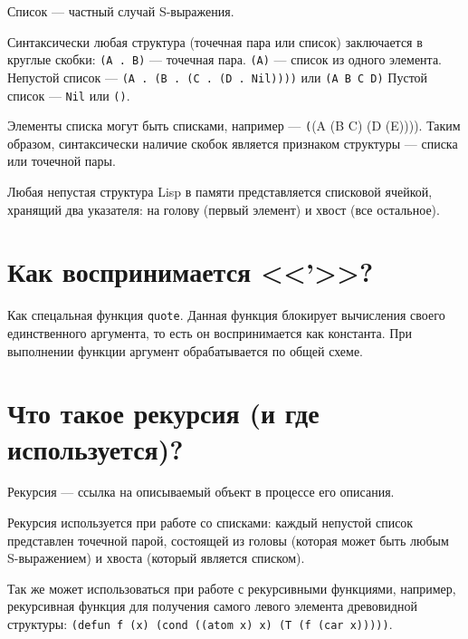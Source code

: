 Список --- частный случай S-выражения.

Синтаксически любая структура (точечная пара или список) заключается в круглые скобки:
\texttt{(A . B)} --- точечная пара.
\texttt{(A)} --- список из одного элемента.
Непустой список --- \texttt{(A . (B . (C . (D . Nil))))} или \texttt{(A B C D)}
Пустой список --- \texttt{Nil} или \texttt{()}.

Элементы списка могут быть списками, например --- \texttt((A (B C) (D (E)))). Таким образом, синтаксически наличие скобок является признаком структуры --- списка или точечной пары.

Любая непустая структура Lisp в памяти представляется  списковой ячейкой, хранящий два указателя: на голову (первый элемент) и хвост (все остальное).

\section{Как воспринимается <<'>>?}

Как спецальная функция \texttt{quote}. Данная функция блокирует вычисления своего единственного аргумента, то есть он воспринимается как константа. При выполнении функции аргумент обрабатывается по общей схеме.

\section{Что такое рекурсия (и где используется)?}

Рекурсия --- ссылка на описываемый объект в процессе его описания.

Рекурсия используется при работе со списками: каждый непустой список представлен точечной парой, состоящей из головы (которая может быть любым S-выражением) и хвоста (который является списком).

Так же может использоваться при работе с рекурсивными функциями, например, рекурсивная функция для получения самого левого элемента древовидной структуры: \texttt{(defun f (x) (cond ((atom x) x) (T (f (car x)))))}.
